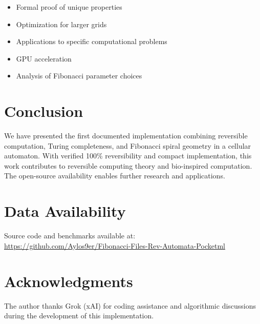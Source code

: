 \documentclass[11pt]{article}
\begin{document}
\begin{itemize}
\item Formal proof of unique properties
\item Optimization for larger grids
\item Applications to specific computational problems
\item GPU acceleration
\item Analysis of Fibonacci parameter choices
\end{itemize}

\section{Conclusion}

We have presented the first documented implementation combining reversible computation, Turing completeness, and Fibonacci spiral geometry in a cellular automaton. With verified 100\% reversibility and compact implementation, this work contributes to reversible computing theory and bio-inspired computation. The open-source availability enables further research and applications.

\section*{Data Availability}

Source code and benchmarks available at: \url{https://github.com/Aylos9er/Fibonacci-Files-Rev-Automata-Pocketml}

\section*{Acknowledgments}

The author thanks Grok (xAI) for coding assistance and algorithmic discussions during the development of this implementation.
\end{document}
